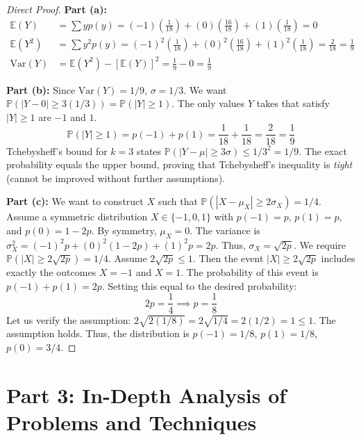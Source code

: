 \documentclass[11pt, a4paper]{article}
\theoremstyle{definition}
\theoremstyle{remark}
\newcommand{\E}{\mathbb{E}}
\newcommand{\Var}{\mathrm{Var}}
\newcommand{\Prob}{\mathbb{P}}
\begin{document}
\begin{proof}[Direct Proof]
\textbf{Part (a):}
\begin{align*}
    \E(Y) &= \sum y p(y) = (-1)\left(\frac{1}{18}\right) + (0)\left(\frac{16}{18}\right) + (1)\left(\frac{1}{18}\right) = 0 \\
    \E(Y^2) &= \sum y^2 p(y) = (-1)^2\left(\frac{1}{18}\right) + (0)^2\left(\frac{16}{18}\right) + (1)^2\left(\frac{1}{18}\right) = \frac{2}{18} = \frac{1}{9} \\
    \Var(Y) &= \E(Y^2) - [\E(Y)]^2 = \frac{1}{9} - 0 = \frac{1}{9}
\end{align*}

\textbf{Part (b):}
Since $\Var(Y) = 1/9$, $\sigma = 1/3$. We want $\Prob(|Y - 0| \ge 3(1/3)) = \Prob(|Y| \ge 1)$.
The only values $Y$ takes that satisfy $|Y| \ge 1$ are $-1$ and $1$.
\[ \Prob(|Y| \ge 1) = p(-1) + p(1) = \frac{1}{18} + \frac{1}{18} = \frac{2}{18} = \frac{1}{9} \]
Tchebysheff's bound for $k=3$ states $\Prob(|Y - \mu| \ge 3\sigma) \le 1/3^2 = 1/9$.
The exact probability equals the upper bound, proving that Tchebysheff's inequality is \textit{tight} (cannot be improved without further assumptions).

\textbf{Part (c):}
We want to construct $X$ such that $\Prob(|X - \mu_X| \ge 2\sigma_X) = 1/4$.
Assume a symmetric distribution $X \in \{-1, 0, 1\}$ with $p(-1) = p$, $p(1) = p$, and $p(0) = 1 - 2p$.
By symmetry, $\mu_X = 0$.
The variance is $\sigma_X^2 = (-1)^2 p + (0)^2(1-2p) + (1)^2 p = 2p$. Thus, $\sigma_X = \sqrt{2p}$.
We require $\Prob(|X| \ge 2\sqrt{2p}) = 1/4$.
Assume $2\sqrt{2p} \le 1$. Then the event $|X| \ge 2\sqrt{2p}$ includes exactly the outcomes $X = -1$ and $X = 1$.
The probability of this event is $p(-1) + p(1) = 2p$.
Setting this equal to the desired probability:
\[ 2p = \frac{1}{4} \implies p = \frac{1}{8} \]
Let us verify the assumption: $2\sqrt{2(1/8)} = 2\sqrt{1/4} = 2(1/2) = 1 \le 1$. The assumption holds.
Thus, the distribution is $p(-1) = 1/8$, $p(1) = 1/8$, $p(0) = 3/4$.
\end{proof}

\newpage
\section{Part 3: In-Depth Analysis of Problems and Techniques}
\end{document}
